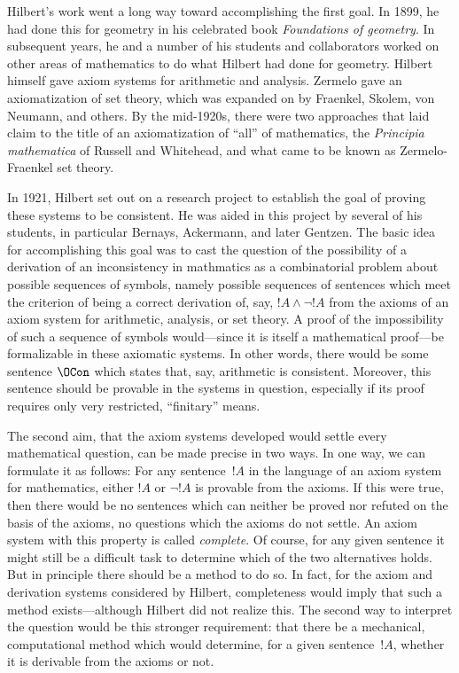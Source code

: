 \documentclass[../../../include/open-logic-section]{subfiles}
\begin{document}
Hilbert's work went a long way toward accomplishing the first goal.
In 1899, he had done this for geometry in his celebrated book
\emph{Foundations of geometry}. In subsequent years, he and a number
of his students and collaborators worked on other areas of mathematics
to do what Hilbert had done for geometry.  Hilbert himself gave axiom
systems for arithmetic and analysis. Zermelo gave an axiomatization of
set theory, which was expanded on by Fraenkel, Skolem, von Neumann,
and others.  By the mid-1920s, there were two approaches that laid
claim to the title of an axiomatization of ``all'' of mathematics, the
\emph{Principia mathematica} of Russell and Whitehead, and what came to
be known as Zermelo-Fraenkel set theory.

In 1921, Hilbert set out on a research project to establish the goal
of proving these systems to be consistent.  He was aided in this
project by several of his students, in particular Bernays, Ackermann,
and later Gentzen. The basic idea for accomplishing this goal was to
cast the question of the possibility of a derivation of an
inconsistency in mathmatics as a combinatorial problem about possible
sequences of symbols, namely possible sequences of sentences which
meet the criterion of being a correct derivation of, say, $!A \land
\lnot !A$ from the axioms of an axiom system for arithmetic, analysis,
or set theory.  A proof of the impossibility of such a sequence of
symbols would---since it is itself a mathematical proof---be
formalizable in these axiomatic systems.  In other words, there would
be some sentence $\OCon$ which states that, say, arithmetic is
consistent.  Moreover, this sentence should be provable in the systems
in question, especially if its proof requires only very restricted,
``finitary'' means.

The second aim, that the axiom systems developed would settle every
mathematical question, can be made precise in two ways. In one way, we
can formulate it as follows: For any sentence~$!A$ in the language of
an axiom system for mathematics, either $!A$ or $\lnot !A$ is provable
from the axioms.  If this were true, then there would be no sentences
which can neither be proved nor refuted on the basis of the axioms, no
questions which the axioms do not settle.  An axiom system with this
property is called \emph{complete}. Of course, for any given sentence
it might still be a difficult task to determine which of the two
alternatives holds.  But in principle there should be a method to do
so.  In fact, for the axiom and derivation systems considered by
Hilbert, completeness would imply that such a method exists---although
Hilbert did not realize this.  The second way to interpret the
question would be this stronger requirement: that there be a
mechanical, computational method which would determine, for a given
sentence~$!A$, whether it is derivable from the axioms or not.
\end{document}
